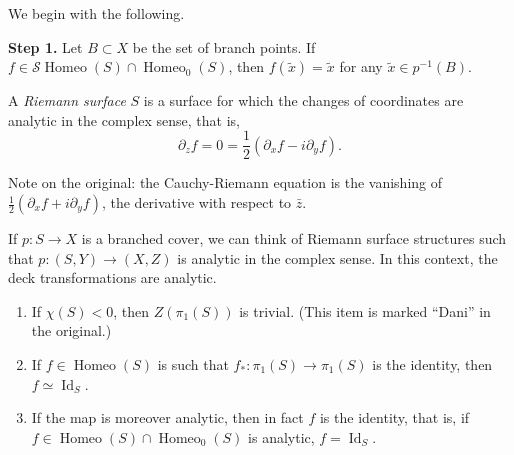 We begin with the following.

\medskip\noindent
{\bf Step 1.} Let $B\subset X$ be the
set of branch points. If
$f\in\mathcal{S}\operatorname{Homeo}(S)
\cap\operatorname{Homeo}_0(S)$,
then $f(\tilde{x})=\tilde{x}$ for any
$\tilde{x}\in p^{-1}(B)$.

\begin{definition}
\label{definition-riemann-surface}
A {\it Riemann surface} $S$ is a surface
for which the changes of coordinates are
analytic in the complex sense, that is,
$$
\partial_zf=0=\frac{1}{2}
(\partial_xf-i\partial_yf).
$$
\end{definition}

Note on the original: the
Cauchy-Riemann equation is the
vanishing of
$\frac{1}{2}
(\partial_xf+i\partial_yf)$,
the derivative with respect to
$\bar{z}$.

\begin{remark}
\label{remark-analytic-cover}
If $p:S\to X$ is a branched cover, we
can think of Riemann surface structures
such that $p:(S,Y)\to(X,Z)$ is analytic
in the complex sense. In this context,
the deck transformations are analytic.
\end{remark}

\begin{exercise}[Homework]
\label{exercise-trivial-center}
\begin{enumerate}
\item If $\chi(S)<0$, then
$Z(\pi_1(S))$ is trivial. (This item is
marked ``Dani'' in the original.)
\item If $f\in\operatorname{Homeo}(S)$
is such that
$f_*:\pi_1(S)\to\pi_1(S)$ is the
identity, then
$f\simeq\operatorname{Id}_S$.
\item If the map is moreover analytic,
then in fact $f$ is the identity, that
is, if
$f\in\operatorname{Homeo}(S)\cap
\operatorname{Homeo}_0(S)$
is analytic, $f=\operatorname{Id}_S$.
\end{enumerate}
\end{exercise}

